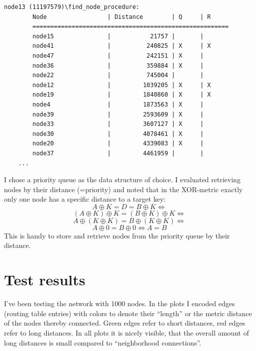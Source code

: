 \documentclass[a4paper,10pt,notitlepage]{article}
\begin{document}
\begin{lstlisting}
node13 (11197579)\find_node_procedure:
        Node                 | Distance        | Q     | R     
        =======================================================
        node15               |           21757 |       |       
        node41               |          240825 | X     | X     
        node47               |          242151 | X     |       
        node36               |          359884 | X     |       
        node22               |          745004 |       |       
        node12               |         1039205 | X     | X     
        node19               |         1840860 | X     | X     
        node4                |         1873563 | X     |       
        node39               |         2593609 | X     |       
        node33               |         3607127 | X     |       
        node30               |         4078461 | X     |       
        node20               |         4339083 | X     |       
        node37               |         4461959 |       |       
 	...

\end{lstlisting}

I chose a priority queue as the data structure of choice.
I evaluated retrieving nodes by their distance (=priority) and noted that in the XOR-metric exactly only one node has a specific distance to a target key:
$$A \oplus K = D = B \oplus K \Leftrightarrow $$
$$ (A \oplus K) \oplus K = (B \oplus K) \oplus K \Leftrightarrow $$
$$A \oplus (K \oplus K) = B \oplus (K \oplus K)  \Leftrightarrow$$
$$ A \oplus 0 = B \oplus 0 \Leftrightarrow A = B$$
This is handy to store and retrieve nodes from the priority queue by their distance.
\section{Test results}
I've been testing the network with 1000 nodes.
In the plots I encoded edges (routing table entries) with colors to denote their ``length'' or the metric distance of the nodes thereby connected.
Green edges refer to short distances, red edges refer to long distances.
In all plots it is nicely visible, that the overall amount of long distances is small compared to ``neighborhood connections''.
\pagebreak
\end{document}
